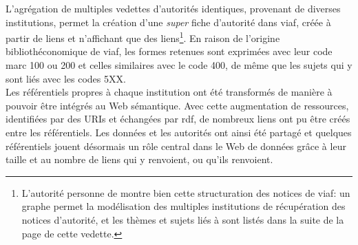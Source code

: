 L'agrégation de multiples vedettes d'autorités identiques, provenant de diverses institutions, permet la création d'une \textit{super} fiche d'autorité dans \ac{viaf}, créée à partir de liens et n'affichant que des liens\footnote{L'autorité personne de \href{http://viaf.org/viaf/108762210/}{} montre bien cette structuration des notices de \ac{viaf}: un graphe permet la modélisation des multiples institutions de récupération des notices d'autorité, et les thèmes et sujets liés à  sont listés dans la suite de la page de cette vedette.}. En raison de l'origine bibliothéconomique de \ac{viaf}, les formes retenues sont exprimées avec leur code \ac{marc} 100 ou 200 et celles similaires avec le code 400, de même que les sujets qui y sont liés avec les codes 5XX.\\


\bigskip
\bigskip
Les référentiels propres à chaque institution ont été transformés de manière à pouvoir être intégrés au Web sémantique. Avec cette augmentation de ressources, identifiées par des URIs et échangées par \ac{rdf}, de nombreux liens ont pu être créés entre les référentiels. Les données et les autorités ont ainsi été partagé et quelques référentiels jouent désormais un rôle central dans le Web de données grâce à leur taille et au nombre de liens qui y renvoient, ou qu'ils renvoient.